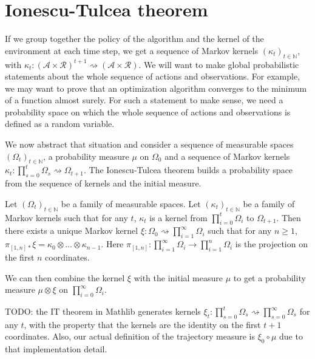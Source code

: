 \section{Ionescu-Tulcea theorem}

If we group together the policy of the algorithm and the kernel of the environment at each time step, we get a sequence of Markov kernels $(\kappa_t)_{t \in \mathbb{N}}$, with $\kappa_t : (\mathcal{A} \times \mathcal{R})^{t+1}  \rightsquigarrow (\mathcal{A} \times \mathcal{R})$.
We will want to make global probabilistic statements about the whole sequence of actions and observations.
For example, we may want to prove that an optimization algorithm converges to the minimum of a function almost surely.
For such a statement to make sense, we need a probability space on which the whole sequence of actions and observations is defined as a random variable.

We now abstract that situation and consider a sequence of measurable spaces $(\Omega_t)_{t \in \mathbb{N}}$, a probability measure $\mu$ on $\Omega_0$ and a sequence of Markov kernels $\kappa_t : \prod_{s=0}^t \Omega_s \rightsquigarrow \Omega_{t+1}$.
The Ionescu-Tulcea theorem builds a probability space from the sequence of kernels and the initial measure.

\begin{theorem}\label{thm:ionescu-tulcea}
  \mathlibok
Let $(\Omega_t)_{t \in \mathbb{N}}$ be a family of measurable spaces. Let $(\kappa_t)_{t \in \mathbb{N}}$ be a family of Markov kernels such that for any $t$, $\kappa_t$ is a kernel from $\prod_{i=0}^t \Omega_{i}$ to $\Omega_{t+1}$.
Then there exists a unique Markov kernel $\xi : \Omega_0 \rightsquigarrow \prod_{i = 1}^{\infty} \Omega_{i}$ such that for any $n \ge 1$,
$\pi_{[1,n]*} \xi = \kappa_0 \otimes \ldots \otimes \kappa_{n-1}$.
Here $\pi_{[1,n]} : \prod_{i=1}^{\infty} \Omega_i \to \prod_{i=1}^n \Omega_i$ is the projection on the first $n$ coordinates.
\end{theorem}

We can then combine the kernel $\xi$ with the initial measure $\mu$ to get a probability measure $\mu \otimes \xi$ on $\prod_{i=0}^{\infty} \Omega_i$.

TODO: the IT theorem in Mathlib generates kernels $\xi_t : \prod_{s=0}^t \Omega_s \rightsquigarrow \prod_{s=0}^{\infty} \Omega_s$ for any $t$, with the property that the kernels are the identity on the first $t+1$ coordinates.
Also, our actual definition of the trajectory measure is $\xi_0 \circ \mu$ due to that implementation detail.

